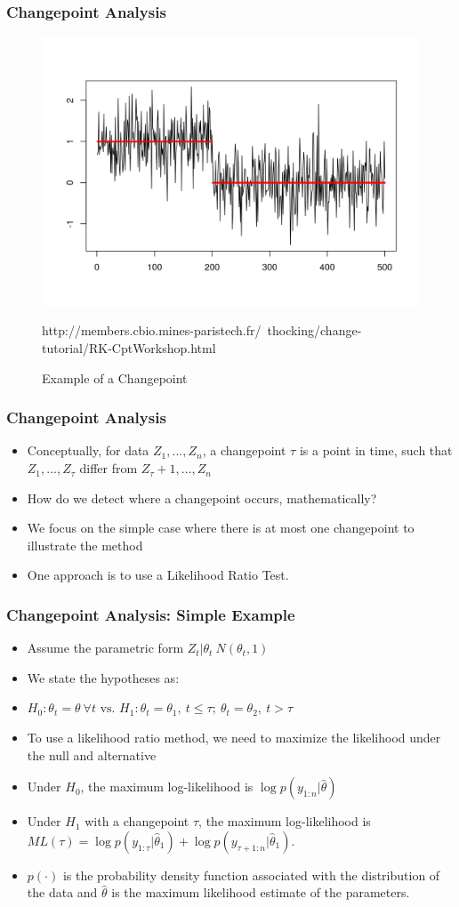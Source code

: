 \documentclass{beamer}
\begin{document}
\begin{frame}
\frametitle{Changepoint Analysis}
\begin{figure}
\centering
\includegraphics[width=0.75\linewidth]{../img/changepointex.png}
\caption{Example of a Changepoint}

http://members.cbio.mines-paristech.fr/~thocking/change-tutorial/RK-CptWorkshop.html
\end{figure}
\end{frame}

\begin{frame}
\frametitle{Changepoint Analysis}
\begin{itemize}
\item Conceptually, for data $Z_1,...,Z_n$, a changepoint $\tau$ is a point in time, such that $Z_1,...,Z_\tau$ differ from  $Z_\tau+1,...,Z_n$
\item How do we detect where a changepoint occurs, mathematically?
\item We focus on the simple case where there is at most one changepoint to illustrate the method
\item One approach is to use a Likelihood Ratio Test.
\end{itemize}
\end{frame}

\begin{frame}
\frametitle{Changepoint Analysis: Simple Example}
\begin{itemize}
\item Assume the parametric form $Z_t|\theta_t~N(\theta_t,1)$
\item We state the hypotheses as: 		\item $H_0:\theta_t=\theta~ \forall t \text{ vs. } H_1:\theta_t=\theta_1,~t\leq\tau;~ \theta_t=\theta_2,~t>\tau   $
\item To use a likelihood ratio method, we need to maximize the likelihood under the null and alternative
\item Under $H_0$, the maximum log-likelihood is $\log p(y_{1:n}|\hat{\theta})$
\item Under $H_1$ with a changepoint $\tau$, the maximum log-likelihood is $ML(\tau) = \log p(y_{1:\tau}|\hat{\theta}_1) +  \log p(y_{\tau+1:n}|\hat{\theta}_1)$. 
\item  $p(\cdot)$ is the probability density function associated with the distribution of the data and $\hat{\theta}$ is
the maximum likelihood estimate of the parameters.
\end{itemize}
\end{frame}
\end{document}
